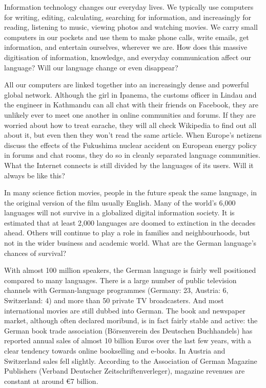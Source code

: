 \begin{multicols}{2}

Information technology changes our everyday lives. We typically use computers for writing, editing, calculating, searching for information, and increasingly for reading, listening to music, viewing photos and watching movies. We carry small computers in our pockets and use them to make phone calls, write emails, get information, and entertain ourselves, wherever we are. How does this massive digitisation of information, knowledge, and everyday communication affect our language? Will our language change or even disappear? 

All our computers are linked together into an increasingly dense and powerful global network. Although the girl in Ipanema, the customs officer in Lindau and the engineer in Kathmandu can all chat with their friends on Facebook, they are unlikely ever to meet one another in online communities and forums. If they are worried about how to treat earache, they will all check Wikipedia to find out all about it, but even then they won’t read the same article. When Europe's netizens discuss the effects of the Fukushima nuclear accident on European energy policy in forums and chat rooms, they do so in cleanly separated language communities. What the Internet connects is still divided by the languages of its users. Will it always be like this? 


In many science fiction movies, people in the future speak the same language, in the original version of the film usually English.
Many of the world’s 6,000 languages will not survive in a globalized digital information society. It is estimated that at least 2,000 languages are doomed to extinction in the decades ahead. Others will continue to play a role in families and neighbourhoods, but not in the wider business and academic world. What are the German language’s chances of survival? 


With almost 100 million speakers, the German language is fairly well positioned compared to many languages. There is a large number of public television channels with German-language programmes (Germany: 23, Austria: 6, Switzerland: 4) and more than 50 private TV broadcasters. And most international movies are still dubbed into German.  
The book and newspaper market, although often declared moribund, is in fact fairly stable and active: the German book trade association (Börsenverein des Deutschen Buchhandels) has reported annual sales of almost 10 billion Euros over the last few years, with a clear tendency towards online bookselling and e-books. In Austria and Switzerland sales fell slightly. According to the Association of German Magazine Publishers (Verband Deutscher Zeitschriftenverleger), magazine revenues are constant at around €7 billion. 


\end{multicols}
